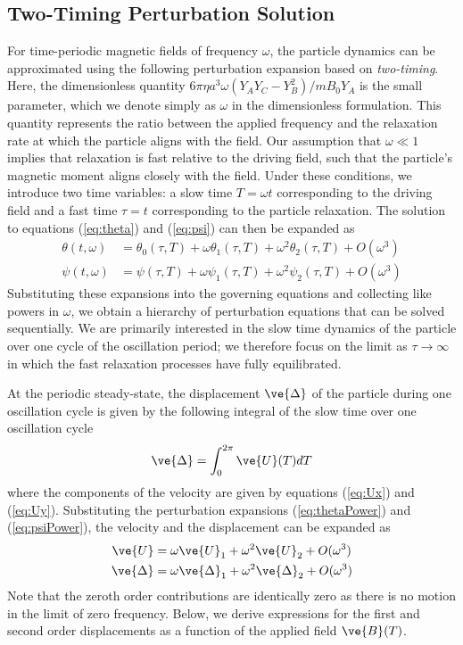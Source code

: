 \subsection{Two-Timing Perturbation Solution}

For time-periodic magnetic fields of frequency $\omega$, the particle dynamics can be approximated using the following perturbation expansion based on \emph{two-timing}.\autocite{Strogatz2015} Here, the dimensionless quantity $6\pi \eta a^3 \omega (Y_A Y_C - Y_B^2)/m B_0 Y_A$ is the small parameter, which we denote simply as $\omega$ in the dimensionless formulation. This quantity represents the ratio between the applied frequency and the relaxation rate at which the particle aligns with the field.  Our assumption that $\omega\ll 1$ implies that relaxation is fast relative to the driving field, such that the particle's magnetic moment aligns closely with the field. Under these conditions, we introduce two time variables: a slow time $T=\omega t$ corresponding to the driving field and a fast time $\tau=t$ corresponding to the particle relaxation.  The solution to equations (\ref{eq:theta}) and (\ref{eq:psi}) can then be expanded as
\begin{align}
    \theta(t,\omega) &= \theta_0(\tau,T) + \omega \theta_1(\tau,T) + \omega^2 \theta_2(\tau,T) + O(\omega^3) \label{eq:thetaPower}
    \\
    \psi(t,\omega) &= \psi(\tau,T) + \omega \psi_1(\tau,T) + \omega^2 \psi_2(\tau,T) + O(\omega^3) \label{eq:psiPower}
\end{align}
Substituting these expansions into the governing equations and collecting like powers in $\omega$, we obtain a hierarchy of perturbation equations that can be solved sequentially. We are primarily interested in the slow time dynamics of the particle over one cycle of the oscillation period; we therefore focus on the limit as $\tau\rightarrow\infty$ in which the fast relaxation processes have fully equilibrated.

At the periodic steady-state, the displacement $\ve{\Delta}$ of the particle during one oscillation cycle is given by the following integral of the slow time over one oscillation cycle
\begin{equation}
    \ve{\Delta} = \int_0^{2\pi} \ve{U}(T) dT
\end{equation}
where the components of the velocity are given by equations (\ref{eq:Ux}) and (\ref{eq:Uy}).  Substituting the perturbation expansions (\ref{eq:thetaPower}) and (\ref{eq:psiPower}), the velocity and the displacement can be expanded as
\begin{align}
    \ve{U} &= \omega \ve{U}_1 + \omega^2 \ve{U}_2 + O(\omega^3)
    \\
    \ve{\Delta} &= \omega \ve{\Delta}_1 + \omega^2 \ve{\Delta}_2 + O(\omega^3)
\end{align}
Note that the zeroth order contributions are identically zero as there is no motion in the limit of zero frequency. Below, we derive expressions for the first and second order displacements as a function of the applied field $\ve{B}(T)$.

